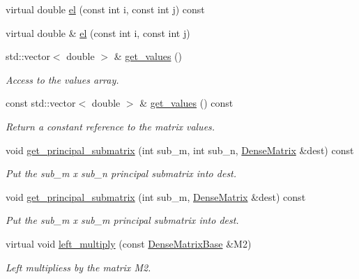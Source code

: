 \begin{DoxyCompactItemize}
virtual double \mbox{\hyperlink{classfemus_1_1_dense_matrix_a3b37181274fbe8eca1523acdecb59bd0}{el}} (const int i, const int j) const
\item 
virtual double \& \mbox{\hyperlink{classfemus_1_1_dense_matrix_a9867b5e9b16b8ec746ebde4270239248}{el}} (const int i, const int j)
\item 
std\+::vector$<$ double $>$ \& \mbox{\hyperlink{classfemus_1_1_dense_matrix_a2462d41848e267ba763177c3481eb643}{get\+\_\+values}} ()
\begin{DoxyCompactList}\small\item\em Access to the values array. \end{DoxyCompactList}\item 
const std\+::vector$<$ double $>$ \& \mbox{\hyperlink{classfemus_1_1_dense_matrix_a7d4b74e15b37ec3927d3f533dc0c0e07}{get\+\_\+values}} () const
\begin{DoxyCompactList}\small\item\em Return a constant reference to the matrix values. \end{DoxyCompactList}\item 
void \mbox{\hyperlink{classfemus_1_1_dense_matrix_ac6fa82dae47d2bb783f8b1507b730b1b}{get\+\_\+principal\+\_\+submatrix}} (int sub\+\_\+m, int sub\+\_\+n, \mbox{\hyperlink{classfemus_1_1_dense_matrix}{Dense\+Matrix}} \&dest) const
\begin{DoxyCompactList}\small\item\em Put the {\ttfamily sub\+\_\+m} x {\ttfamily sub\+\_\+n} principal submatrix into {\ttfamily dest}. \end{DoxyCompactList}\item 
void \mbox{\hyperlink{classfemus_1_1_dense_matrix_ace38881dc4185f79340438082fcfccfd}{get\+\_\+principal\+\_\+submatrix}} (int sub\+\_\+m, \mbox{\hyperlink{classfemus_1_1_dense_matrix}{Dense\+Matrix}} \&dest) const
\begin{DoxyCompactList}\small\item\em Put the {\ttfamily sub\+\_\+m} x {\ttfamily sub\+\_\+m} principal submatrix into {\ttfamily dest}. \end{DoxyCompactList}\item 
virtual void \mbox{\hyperlink{classfemus_1_1_dense_matrix_a80917b8698400957bc821308be3dafe5}{left\+\_\+multiply}} (const \mbox{\hyperlink{classfemus_1_1_dense_matrix_base}{Dense\+Matrix\+Base}} \&M2)
\begin{DoxyCompactList}\small\item\em Left multipliess by the matrix {\ttfamily M2}. \end{DoxyCompactList}\item 

\end{DoxyCompactItemize}

